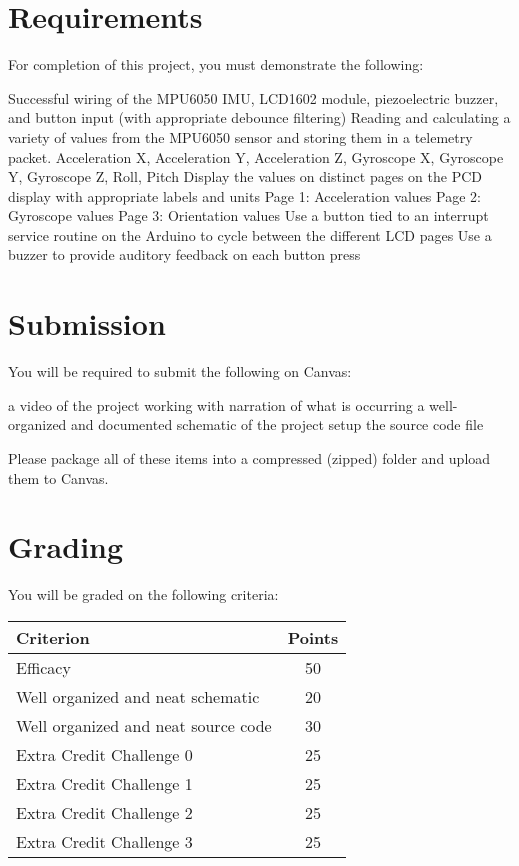 \section*{Requirements} 
For completion of this project, you must demonstrate the following:
\begin{outline}
    \1 Successful wiring of the MPU6050 IMU, LCD1602 module, piezoelectric buzzer, and button input (with appropriate debounce filtering)
    \1 Reading and calculating a variety of values from the MPU6050 sensor and storing them in a telemetry packet.
        \2 Acceleration X,
        \2 Acceleration Y,
        \2 Acceleration Z,
        \2 Gyroscope X,
        \2 Gyroscope Y,
        \2 Gyroscope Z,
        \2 Roll,
        \2 Pitch
    \1 Display the values on distinct pages on the PCD display with appropriate labels and units
        \2 Page 1: Acceleration values
        \2 Page 2: Gyroscope values
        \2 Page 3: Orientation values
    \1 Use a button tied to an interrupt service routine on the Arduino to cycle between the different LCD pages
    \2 Use a buzzer to provide auditory feedback on each button press 
\end{outline}

\section*{Submission}
You will be required to submit the following on Canvas:
\begin{outline}
    \1 a video of the project working with narration of what is occurring
    \1 a well-organized and documented schematic of the project setup
    \1 the source code file
\end{outline}
Please package all of these items into a compressed (zipped) folder and upload them to Canvas.

\section*{Grading} 
You will be graded on the following criteria:
\begin{table}[h!]
    \begin{tabular}{l | c}
        \toprule
        Criterion & Points \\

        \midrule
        Efficacy & 50 \\
        Well organized and neat schematic & 20 \\
        Well organized and neat source code & 30 \\
        Extra Credit Challenge 0 \footnotemark & 25 \\
        Extra Credit Challenge 1 & 25 \\
        Extra Credit Challenge 2 & 25 \\
        Extra Credit Challenge 3 & 25 \\

        \bottomrule
    \end{tabular}
\end{table}

